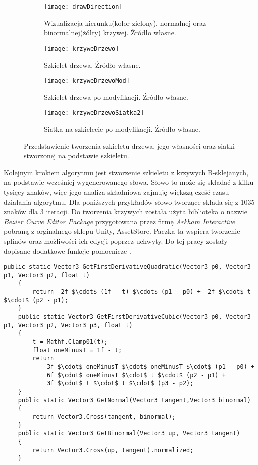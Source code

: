 \documentclass[12pt]{report}
\begin{document}
\begin{sloppypar}
\begin{figure}[!htp]
\centering
\begin{subfigure}{.5\textwidth}
  \centering
  \texttt{[image: drawDirection]}
\caption{Wizualizacja kierunku(kolor zielony), normalnej oraz binormalnej(żółty) krzywej. Źródło własne. \label{unity.drawDirection}}
\end{subfigure}%
\begin{subfigure}{.5\textwidth}
  \centering
  \texttt{[image: krzyweDrzewo]}
\caption{Szkielet drzewa. Źródło własne. \label{unity.krzyweDrzewo}}
\end{subfigure}
%
\begin{subfigure}{.5\textwidth}
  \centering
  \texttt{[image: krzyweDrzewoMod]}
\caption{Szkielet drzewa po modyfikacji. Źródło własne. \label{unity.krzyweDrzewoMod}}
\end{subfigure}%
\begin{subfigure}{.5\textwidth}
\centering
  \texttt{[image: krzyweDrzewoSiatka2]}
\caption{Siatka na szkielecie po modyfikacji. Źródło własne. \label{unity.krzyweDrzewoSiatka}}
\end{subfigure}
\caption{Przedstawienie tworzenia szkieletu drzewa, jego własności oraz siatki stworzonej na podstawie szkieletu.}
\label{unity.direction}
\end{figure}
\newpage
Kolejnym krokiem algorytmu jest stworzenie szkieletu z krzywych B-sklejanych, na podstawie wcześniej wygenerowanego słowa. Słowo to może się składać z kilku tysięcy znaków, więc jego analiza składniowa zajmuję większą cześć czasu działania algorytmu. Dla poniższych przykładów słowo tworzące składa się z 1035 znaków dla 3 iteracji.
 Do tworzenia krzywych została użyta biblioteka o nazwie \textit{Bezier Curve Editor Package}\cite{bezUnity} przygotowana przez firmę \textit{Arkham Interactive} pobraną z orginalnego sklepu Unity, AssetStore. Paczka ta wspiera tworzenie splinów oraz możliwości ich edycji poprzez uchwyty. Do tej pracy zostały dopisane dodatkowe funkcje pomocnicze \cite{youtube}.

\begin{lstlisting}[mathescape=true,label=direction,caption=Funkcje odliczające własności krzywej. ,belowcaptionskip=4pt,captionpos=b]
 public static Vector3 GetFirstDerivativeQuadratic(Vector3 p0, Vector3 p1, Vector3 p2, float t)
    {
        return  2f $\cdot$ (1f - t) $\cdot$ (p1 - p0) +  2f $\cdot$ t $\cdot$ (p2 - p1);
    }
    public static Vector3 GetFirstDerivativeCubic(Vector3 p0, Vector3 p1, Vector3 p2, Vector3 p3, float t)
    {
        t = Mathf.Clamp01(t);
        float oneMinusT = 1f - t;
        return
            3f $\cdot$ oneMinusT $\cdot$ oneMinusT $\cdot$ (p1 - p0) +
            6f $\cdot$ oneMinusT $\cdot$ t $\cdot$ (p2 - p1) +
            3f $\cdot$ t $\cdot$ t $\cdot$ (p3 - p2);
    }
    public static Vector3 GetNormal(Vector3 tangent,Vector3 binormal)
    {
        return Vector3.Cross(tangent, binormal);
    }
    public static Vector3 GetBinormal(Vector3 up, Vector3 tangent)
    {
        return Vector3.Cross(up, tangent).normalized;
    }    
    \end{lstlisting}



\end{sloppypar}
\end{document}
